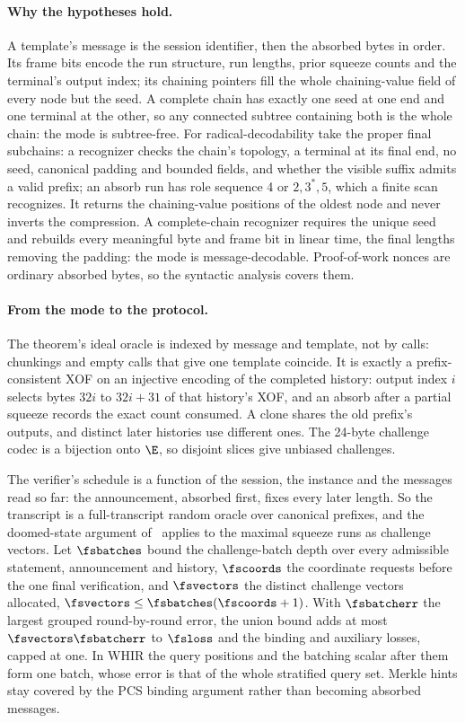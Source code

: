 \paragraph{Why the hypotheses hold.} A template's message is the session identifier, then the absorbed bytes in order. Its frame bits encode the run structure, run lengths, prior squeeze counts and the terminal's output index; its chaining pointers fill the whole chaining-value field of every node but the seed. A complete chain has exactly one seed at one end and one terminal at the other, so any connected subtree containing both is the whole chain: the mode is subtree-free. For radical-decodability take the proper final subchains: a recognizer checks the chain's topology, a terminal at its final end, no seed, canonical padding and bounded fields, and whether the visible suffix admits a valid prefix; an absorb run has role sequence 4 or $2,3^*,5$, which a finite scan recognizes. It returns the chaining-value positions of the oldest node and never inverts the compression. A complete-chain recognizer requires the unique seed and rebuilds every meaningful byte and frame bit in linear time, the final lengths removing the padding: the mode is message-decodable. Proof-of-work nonces are ordinary absorbed bytes, so the syntactic analysis covers them.

\paragraph{From the mode to the protocol.} The theorem's ideal oracle is indexed by message and template, not by calls: chunkings and empty calls that give one template coincide. It is exactly a prefix-consistent XOF on an injective encoding of the completed history: output index $i$ selects bytes $32i$ to $32i+31$ of that history's XOF, and an absorb after a partial squeeze records the exact count consumed. A clone shares the old prefix's outputs, and distinct later histories use different ones. The 24-byte challenge codec is a bijection onto $\E$, so disjoint slices give unbiased challenges.

The verifier's schedule is a function of the session, the instance and the messages read so far: the announcement, absorbed first, fixes every later length. So the transcript is a full-transcript random oracle over canonical prefixes, and the doomed-state argument of~\cite[Definition 5.3 and Theorem 5.8]{CCHLRR18} applies to the maximal squeeze runs as challenge vectors. Let $\fsbatches$ bound the challenge-batch depth over every admissible statement, announcement and history, $\fscoords$ the coordinate requests before the one final verification, and $\fsvectors$ the distinct challenge vectors allocated, $\fsvectors\le\fsbatches(\fscoords+1)$. With $\fsbatcherr$ the largest grouped round-by-round error, the union bound adds at most $\fsvectors\fsbatcherr$ to $\fsloss$ and the binding and auxiliary losses, capped at one. In WHIR the query positions and the batching scalar after them form one batch, whose error is that of the whole stratified query set. Merkle hints stay covered by the PCS binding argument rather than becoming absorbed messages.

